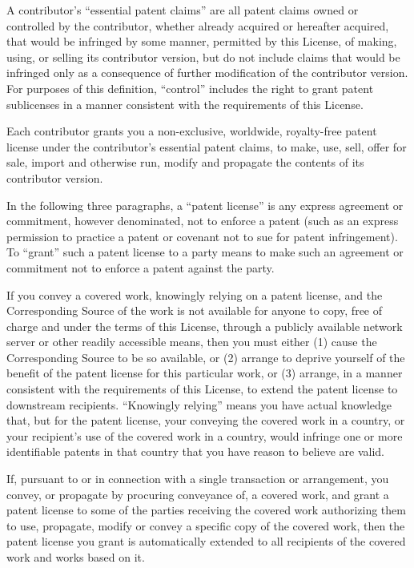 \begin{enumerate}
A contributor's ``essential patent claims'' are all patent claims
owned or controlled by the contributor, whether already acquired or
hereafter acquired, that would be infringed by some manner, permitted
by this License, of making, using, or selling its contributor version,
but do not include claims that would be infringed only as a
consequence of further modification of the contributor version.  For
purposes of this definition, ``control'' includes the right to grant
patent sublicenses in a manner consistent with the requirements of
this License.

Each contributor grants you a non-exclusive, worldwide, royalty-free
patent license under the contributor's essential patent claims, to
make, use, sell, offer for sale, import and otherwise run, modify and
propagate the contents of its contributor version.

In the following three paragraphs, a ``patent license'' is any express
agreement or commitment, however denominated, not to enforce a patent
(such as an express permission to practice a patent or covenant not to
sue for patent infringement).  To ``grant'' such a patent license to a
party means to make such an agreement or commitment not to enforce a
patent against the party.

If you convey a covered work, knowingly relying on a patent license,
and the Corresponding Source of the work is not available for anyone
to copy, free of charge and under the terms of this License, through a
publicly available network server or other readily accessible means,
then you must either (1) cause the Corresponding Source to be so
available, or (2) arrange to deprive yourself of the benefit of the
patent license for this particular work, or (3) arrange, in a manner
consistent with the requirements of this License, to extend the patent
license to downstream recipients.  ``Knowingly relying'' means you have
actual knowledge that, but for the patent license, your conveying the
covered work in a country, or your recipient's use of the covered work
in a country, would infringe one or more identifiable patents in that
country that you have reason to believe are valid.

If, pursuant to or in connection with a single transaction or
arrangement, you convey, or propagate by procuring conveyance of, a
covered work, and grant a patent license to some of the parties
receiving the covered work authorizing them to use, propagate, modify
or convey a specific copy of the covered work, then the patent license
you grant is automatically extended to all recipients of the covered
work and works based on it.


\end{enumerate}
